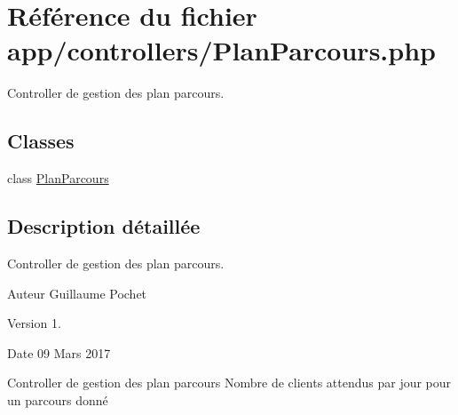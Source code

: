 \hypertarget{_plan_parcours_8php}{}\section{Référence du fichier app/controllers/\+Plan\+Parcours.php}
\label{_plan_parcours_8php}


Controller de gestion des plan parcours.  


\subsection*{Classes}
\begin{DoxyCompactItemize}
\item 
class \hyperlink{class_plan_parcours}{Plan\+Parcours}
\end{DoxyCompactItemize}


\subsection{Description détaillée}
Controller de gestion des plan parcours. 

\begin{DoxyAuthor}{Auteur}
Guillaume Pochet 
\end{DoxyAuthor}
\begin{DoxyVersion}{Version}
1. 
\end{DoxyVersion}
\begin{DoxyDate}{Date}
09 Mars 2017
\end{DoxyDate}
Controller de gestion des plan parcours Nombre de clients attendus par jour pour un parcours donné 